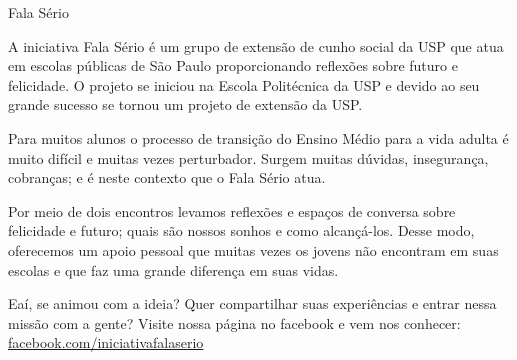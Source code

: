 \begin{subsecao}{Fala Sério}


A iniciativa Fala Sério é um grupo de extensão de cunho social da USP que atua em
escolas públicas de São Paulo proporcionando reflexões sobre futuro e felicidade.
O projeto se iniciou na Escola Politécnica da USP e devido ao seu grande sucesso 
se tornou um projeto de extensão da USP.

Para muitos alunos o processo de transição do Ensino Médio para a vida adulta é 
muito difícil e muitas vezes perturbador. Surgem muitas dúvidas, insegurança, 
cobranças; e é neste contexto que o Fala Sério atua.

Por meio de dois encontros levamos reflexões e espaços de conversa sobre 
felicidade e futuro; quais são nossos sonhos e como alcançá-los. Desse modo, 
oferecemos um apoio pessoal que muitas vezes os jovens não encontram em suas 
escolas e que faz uma grande diferença em suas vidas.

Eaí, se animou com a ideia? Quer compartilhar suas experiências e entrar nessa 
missão com a gente? Visite nossa página no facebook e vem nos conhecer:
\url{facebook.com/iniciativafalaserio}

\end{subsecao}
